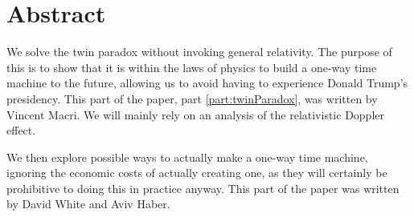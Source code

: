 \chapter*{Abstract}
	We solve the twin paradox without invoking general relativity. The purpose of this is to show that it is within the laws of physics to build a one-way time machine to the future, allowing us to avoid having to experience Donald Trump's presidency. This part of the paper, part \ref{part:twinParadox}, was written by Vincent Macri. We will mainly rely on an analysis of the relativistic Doppler effect.

	We then explore possible ways to actually make a one-way time machine, ignoring the economic costs of actually creating one, as they will certainly be prohibitive to doing this in practice anyway. This part of the paper was written by David White and Aviv Haber.
